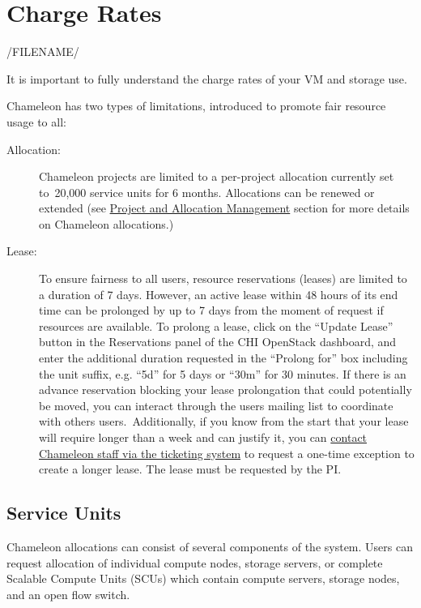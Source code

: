 \section{Charge Rates}
\label{C:cc-charge}

/FILENAME/

It is important to fully understand the charge rates of your VM and storage use.

Chameleon has two types of limitations, introduced to promote fair resource
usage to all:

\begin{description}

\item  [Allocation:] Chameleon projects are limited to a per-project allocation
  currently set to~20,000 service units for 6 months. Allocations can be
  renewed or extended (see
  \href{index.html\#toc-project-and-allocation-management}{Project and
  Allocation Management} section for more details on Chameleon
allocations.)

  \item [Lease:] To ensure fairness to all users, resource reservations (leases)
  are limited to a duration of 7 days. However, an active lease within
  48 hours of its end time can be prolonged by up to 7 days from the
  moment of request if resources are available. To prolong a lease,
  click on the ``Update Lease'' button in the Reservations panel of the
  CHI OpenStack dashboard, and enter the additional duration requested
  in the ``Prolong for'' box including the unit suffix, e.g. ``5d'' for
  5 days or ``30m'' for 30 minutes. If there is an advance reservation
  blocking your lease prolongation that could potentially be moved,
  you can interact through the users mailing list to coordinate with
  others  users.~Additionally, if you know from the start that your
  lease will  require longer than a week and can justify it, you can
  \href{https://www.chameleoncloud.org/user/help/ticket/new/}{contact
    Chameleon staff via the ticketing system} to request a one-time
  exception to create a longer lease. The lease must be requested by
  the PI.

\end{description}

\subsection{Service Units}

Chameleon allocations can consist of several components of the system.
Users can request allocation of individual compute nodes, storage
servers, or complete Scalable Compute Units (SCUs) which contain compute
servers, storage nodes, and an open flow switch.

